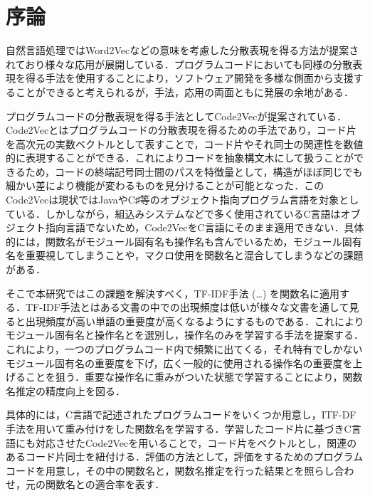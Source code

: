 \documentclass[submit,techrep,noauthor]{ipsj}
\begin{document}
\maketitle

\section{序論}
自然言語処理ではWord2Vec\cite{alon2019code2vec}などの意味を考慮した分散表現を得る方法が提案されており様々な応用が展開している．プログラムコードにおいても同様の分散表現を得る手法を使用することにより，ソフトウェア開発を多様な側面から支援することができると考えられるが，手法，応用の両面ともに発展の余地がある．

プログラムコードの分散表現を得る手法としてCode2Vec\cite{alon2019code2vec}が提案されている．Code2Vecとはプログラムコードの分散表現を得るための手法であり，コード片を高次元の実数ベクトルとして表すことで，コード片やそれ同士の関連性を数値的に表現することができる．これによりコードを抽象構文木にして扱うことができるため，コードの終端記号同士間のパスを特徴量として，構造がほぼ同じでも細かい差により機能が変わるものを見分けることが可能となった．このCode2Vecは現状ではJavaやC♯等のオブジェクト指向プログラム言語を対象としている．しかしながら，組込みシステムなどで多く使用されているC言語はオブジェクト指向言語でないため，Code2VecをC言語にそのまま適用できない．具体的には，関数名がモジュール固有名も操作名も含んでいるため，モジュール固有名を重要視してしまうことや，マクロ使用を関数名と混合してしまうなどの課題がある．

そこで本研究ではこの課題を解決すべく，TF-IDF手法 (…) を関数名に適用する．TF-IDF手法とはある文書の中での出現頻度は低いが様々な文書を通して見ると出現頻度が高い単語の重要度が高くなるようにするものである．これによりモジュール固有名と操作名とを選別し，操作名のみを学習する手法を提案する．これにより，一つのプログラムコード内で頻繁に出てくる，それ特有でしかないモジュール固有名の重要度を下げ，広く一般的に使用される操作名の重要度を上げることを狙う．重要な操作名に重みがついた状態で学習することにより，関数名推定の精度向上を図る．

具体的には，C言語で記述されたプログラムコードをいくつか用意し，ITF-DF手法を用いて重み付けをした関数名を学習する．学習したコード片に基づきC言語にも対応させたCode2Vecを用いることで，コード片をベクトルとし，関連のあるコード片同士を紐付ける．評価の方法として，評価をするためのプログラムコードを用意し，その中の関数名と，関数名推定を行った結果とを照らし合わせ，元の関数名との適合率を表す．
\end{document}
